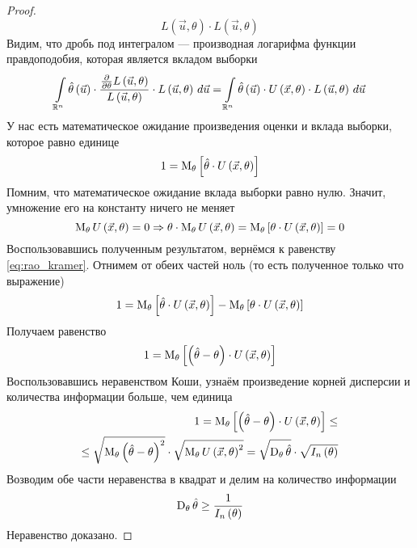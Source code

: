 \begin{proof}
\begin{equation*}
{      {L\left( \vec{u},\theta \right)}
        \cdot L\left( \vec{u},\theta \right)}
  \end{equation*}
  Видим, что дробь под интегралом --- производная логарифма
  функции правдоподобия, которая является вкладом выборки
  \begin{equation*}
    \integral{\mathbb{R}^n}{}{\vec{u}}{\hat{\theta}\left( \vec{u} \right)
      \cdot \frac{
        \frac{\partial}{\partial \theta}L\left( \vec{u},\theta \right)}
        {L\left( \vec{u},\theta \right)}
          \cdot L\left( \vec{u},\theta \right)}
    = \integral{\mathbb{R}^n}{}{\vec{u}}{\hat{\theta}\left( \vec{u} \right)
      \cdot
        U\left( \vec{x},\theta \right)
          \cdot L\left( \vec{u},\theta \right)}
  \end{equation*}
  У нас есть математическое ожидание произведения оценки и вклада выборки,
  которое равно единице
  \begin{equation}\label{eq:rao_kramer}
    1 = \Meanof{\theta}{\hat{\theta}\cdot U\left( \vec{x},\theta \right)}
  \end{equation}
  Помним, что математическое ожидание вклада выборки равно нулю.
  Значит, умножение его на константу ничего не меняет
  \begin{equation*}
    \meanof{\theta}{U\left( \vec{x},\theta \right)}=0
    \Rightarrow 
    \theta \cdot \meanof{\theta}{U\left( \vec{x},\theta \right)}
    = \Meanof{\theta}{\theta \cdot U\left(\vec{x},\theta\right)}
    = 0
  \end{equation*}
  Воспользовавшись полученным результатом, вернёмся к равенству
  \eqref{eq:rao_kramer}.
  Отнимем от обеих частей ноль (то есть полученное только что выражение)
  \begin{equation*}
    1 = \Meanof{\theta}{\hat{\theta}\cdot U\left( \vec{x},\theta \right)}
      - \Meanof{\theta}{\theta \cdot U\left(\vec{x},\theta\right)}
  \end{equation*}
  Получаем равенство
  \begin{equation*}
    1 = \Meanof{\theta}{\left(\hat{\theta}-\theta\right)
    \cdot U\left( \vec{x},\theta \right)}
  \end{equation*}
  Воспользовавшись неравенством Коши, узнаём
  произведение корней дисперсии и количества информации больше, чем единица
  \begin{equation}\label{eq:rao_kramer_koshi}
    \begin{split}
    1 = \meanof{\theta}{
      \left[\left(\hat{\theta}-\theta\right)
        \cdot U\left( \vec{x},\theta \right)\right]} \le \\
    \le \sqrt{\meanof{\theta}{
      \left(\hat{\theta}-\theta\right)^2}}
      \cdot \sqrt{\meanof{\theta}{U\left( \vec{x},\theta \right)^2}}
    = \sqrt{\dispersionof{\theta}{\hat{\theta}}}
      \cdot \sqrt{I_n\left(\theta\right)}
    \end{split}
  \end{equation}
  Возводим обе части неравенства в квадрат и делим на количество информации
  \begin{equation*}
    \dispersionof{\theta}{\hat{\theta}} \ge \frac{1}{I_n\left( \theta \right)}
  \end{equation*}
  Неравенство доказано.
\end{proof}
